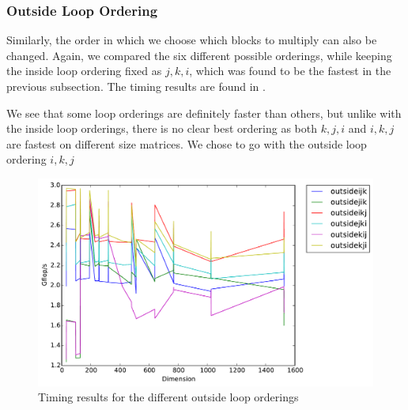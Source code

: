 \subsubsection{Outside Loop Ordering}
Similarly, the order in which we choose which blocks to multiply can also be
changed. Again, we compared the six different possible orderings, while
keeping the inside loop ordering fixed as $j,k,i$, which was found to be the
fastest in the previous subsection. The timing results are found in
.

We see that some loop orderings are definitely faster than others, but unlike
with the inside loop orderings, there is no clear best ordering as both $k,j,i$
and $i,k,j$ are fastest on different size matrices. We chose to go with the
outside loop ordering $i,k,j$

\begin{figure}[hh]
  \centering
  \includegraphics[width=\textwidth]{timing_outsideloops.pdf}
  \caption{Timing results for the different outside loop orderings}
  \label{fig:outsideloop}
\end{figure}

